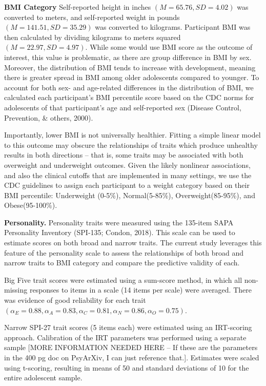 \documentclass[man]{apa6}
\begin{document}
\textbf{BMI Category} Self-reported height in inches \((M = 65.76, SD = 4.02)\) was converted to meters, and self-reported weight in pounds \((M = 141.51, SD = 35.29)\) was converted to kilograms. Participant BMI was then calculated by dividing kilograms to meters squared \((M = 22.97, SD = 4.97)\). While some would use BMI score as the outcome of interest, this value is problematic, as there are group difference in BMI by sex. Moreover, the distribution of BMI tends to increase with development, meaning there is greater spread in BMI among older adolescents compared to younger. To account for both sex- and age-related differences in the distribution of BMI, we calculated each participant's BMI percentile score based on the CDC norms for adolescents of that participant's age and self-reported sex (Disease Control, Prevention, \& others, 2000).

Importantly, lower BMI is not universally healthier. Fitting a simple linear model to this outcome may obscure the relationships of traits which produce unhealthy results in both directions -- that is, some traits may be associated with both overweight and underweight outcomes. Given the likely nonlinear associations, and also the clinical cutoffs that are implemented in many settings, we use the CDC guidelines to assign each participant to a weight category based on their BMI percentile: Underweight (0-5\%), Normal(5-85\%), Overweight(85-95\%), and Obese(95-100\%).

\textbf{Personality.} Personality traits were measured using the 135-item SAPA Personality Inventory (SPI-135; Condon, 2018). This scale can be used to estimate scores on both broad and narrow traits. The current study leverages this feature of the personality scale to assess the relationships of both broad and narrow traits to BMI category and compare the predictive validity of each.

Big Five trait scores were estimated using a sum-score method, in which all non-missing responses to items in a scale (14 items per scale) were averaged. There was evidence of good reliability for each trait \(( \alpha_E = 0.88, \alpha_A = 0.83, \alpha_C = 0.81, \alpha_N = 0.86, \alpha_O = 0.75)\).

Narrow SPI-27 trait scores (5 items each) were estimated using an IRT-scoring approach. Calibration of the IRT parameters was performed using a separate sample {[}MORE INFORMATION NEEDED HERE -- If these are the parameters in the 400 pg doc on PsyArXiv, I can just reference that.{]}. Estimates were scaled using t-scoring, resulting in means of 50 and standard deviations of 10 for the entire adolescent sample.
\end{document}
